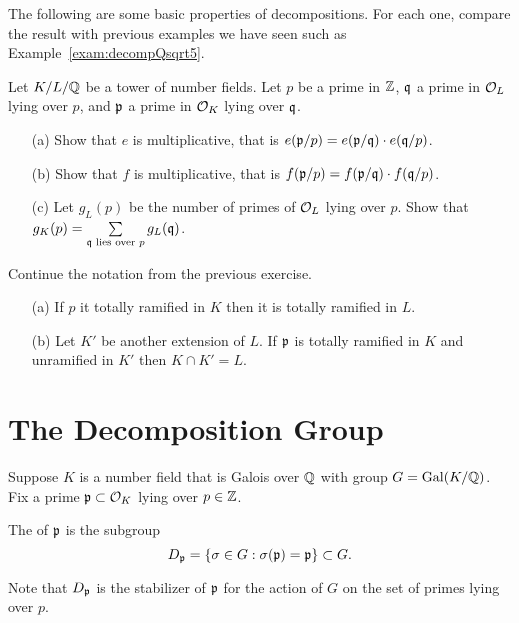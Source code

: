 \begin{exercise}\label{ex:ramificationmultiplicative}
	The following are some basic properties of decompositions.
	For each one, compare the result with previous examples
	we have seen such as Example~\ref{exam:decompQsqrt5}.

	Let $K/L/\mathbb{Q}$ be a tower of number fields. Let $p$ be a prime
	in $\mathbb{Z}$, $\mathfrak{q}$ a prime in $\mathcal{O}_L$ lying over $p$, and $\mathfrak{p}$ a prime
	in $\mathcal{O}_K$ lying over $\mathfrak{q}$.
	\begin{enumerate}
		\item[(a)] Show that $e$ is multiplicative,
		that is $e(\mathfrak{p}/p)=e(\mathfrak{p}/\mathfrak{q}) \cdot e(\mathfrak{q}/p)$.

		\item[(b)] Show that $f$ is multiplicative,
		that is $f(\mathfrak{p}/p)=f(\mathfrak{p}/\mathfrak{q}) \cdot f(\mathfrak{q}/p)$.

		\item[(c)] Let $g_L(p)$ be the number of primes
		of $\mathcal{O}_L$ lying over $p$. Show that
		$g_K(p) = \sum\limits_{\mathfrak{q} \text{ lies over } p} g_L(\mathfrak{q})$.
	\end{enumerate}
\end{exercise}

\begin{exercise}
	Continue the notation from the previous exercise.
	\begin{enumerate}
		\item[(a)]
		If $p$ it totally ramified in $K$
		then it is totally ramified in $L$.

		\item[(b)]
		Let $K'$ be another extension of $L$.
		If $\mathfrak{p}$ is totally ramified in $K$ and unramified in $K'$
		then $K\cap K' = L$.
	\end{enumerate}
\end{exercise}

\section{The Decomposition Group}

Suppose $K$ is a number field that is Galois over $\mathbb{Q}$ with
group $G=\operatorname{Gal}(K/\mathbb{Q})$. Fix a prime $\mathfrak{p}\subset \mathcal{O}_K$ lying over $p\in\mathbb{Z}$.
\begin{definition}\label{def:decomp}
	The  of $\mathfrak{p}$ is the subgroup
	$$
		D_{\mathfrak{p}} = \{\sigma \in G : \sigma(\mathfrak{p})=\mathfrak{p}\} \subset G.
	$$
\end{definition}
Note that $D_{\mathfrak{p}}$ is the stabilizer of $\mathfrak{p}$ for
the action of $G$ on the set of primes lying over $p$.

